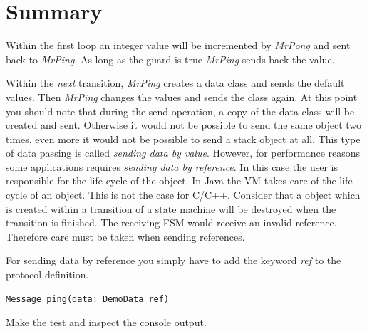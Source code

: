 \section{Summary}

Within the first loop an integer value will be incremented by \textit{MrPong} and sent back to \textit{MrPing}. As long as the guard is true \textit{MrPing} sends back the value.

Within the \textit{next} transition, \textit{MrPing} creates a data class and sends the default values. Then \textit{MrPing} changes the values and sends the class again. At this point you should note that during the send operation, a copy of the data class will be created and sent. Otherwise it would not be possible to send the same object two times, even more it would not be possible to send a stack object at all. This type of data passing is called \textit{sending data by value}.
However, for performance reasons some applications requires \textit{sending data by reference}. In this case the user is responsible for the life cycle of the object. In Java the VM takes care of the life cycle of an object. This is not the case for C/C++. Consider that a object which is created within a transition of a state machine will be destroyed when the transition is finished. The receiving FSM would receive an invalid reference. Therefore care must be taken when sending references.      

For sending data by reference you simply have to add the keyword \textit{ref} to the protocol definition.
 
\begin{verbatim}Message ping(data: DemoData ref)\end{verbatim}

Make the test and inspect the console output.
